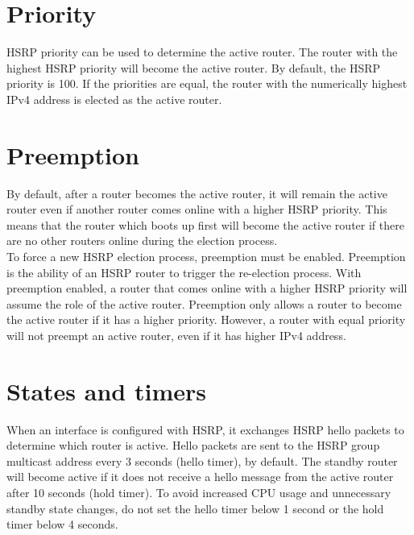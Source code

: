 \section{Priority}

HSRP priority can be used to determine the active router. The router with the highest HSRP priority will become the active router. By default, the HSRP priority is 100. If the priorities are equal, the router with the numerically highest IPv4 address is elected as the active router.

\section{Preemption}

By default, after a router becomes the active router, it will remain the active router even if another router comes online with a higher HSRP priority. This means that the router which boots up first will become the active router if there are no other routers online during the election process.\\

To force a new HSRP election process, preemption must be enabled. Preemption is the ability of an HSRP router to trigger the re-election process. With preemption enabled, a router that comes online with a higher HSRP priority will assume the role of the active router. Preemption only allows a router to become the active router if it has a higher priority. However, a router with equal priority will not preempt an active router, even if it has higher IPv4 address.

\section{States and timers}

When an interface is configured with HSRP, it exchanges HSRP hello packets to determine which router is active. Hello packets are sent to the HSRP group multicast address every 3 seconds (hello timer), by default. The standby router will become active if it does not receive a hello message from the active router after 10 seconds (hold timer). To avoid increased CPU usage and unnecessary standby state changes, do not set the hello timer below 1 second or the hold timer below 4 seconds.


